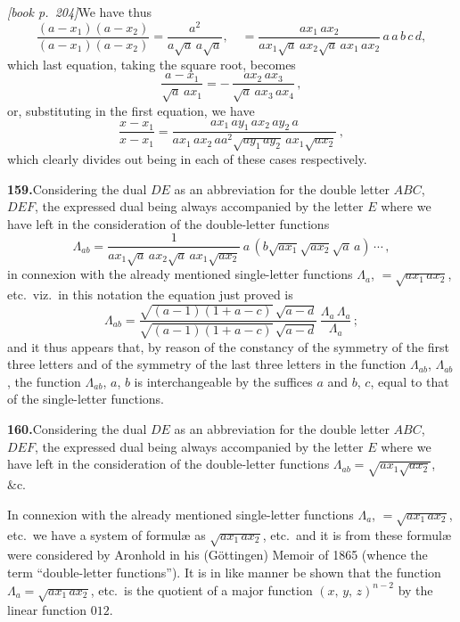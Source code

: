 \documentclass[11pt,a4paper]{article}
\begin{document}
\medskip\noindent\textit{[book p.~204]}\quad We have thus
\[
\frac{(a - x_1)(a - x_2)}{(a - x_1)(a - x_2)} = \frac{a^2}{a\sqrt{a}\,a\sqrt{a}},\quad = \frac{a x_1\,a x_2}{a x_1\sqrt{a}\,a x_2\sqrt{a}\,a x_1\,a x_2}\,a\,a\,b\,c\,d,
\]
which last equation, taking the square root, becomes
\[
\frac{a - x_1}{\sqrt{a}\,a x_1} = -\,\frac{a x_2\,a x_3}{\sqrt{a}\,a x_3\,a x_4}\,,
\]
or, substituting in the first equation, we have
\[
\frac{x - x_1}{x - x_1} = \frac{ax_1\,ay_1\,ax_2\,ay_2\,a}{a x_1\,a x_2\,a a^2\sqrt{ay_1\,ay_2}\,a x_1\sqrt{ax_2}}\,,
\]
which clearly divides out being in each of these cases respectively.

\medskip\noindent\textbf{159.}\quad Considering the dual $DE$ as an abbreviation for the double letter $ABC$, $DEF$, the expressed dual being always accompanied by the letter $E$ where we have left in the consideration of the double-letter functions
\[
\Lambda_{ab} = \frac{1}{a x_1\sqrt{a}\,a x_2\sqrt{a}\,a x_1\sqrt{a x_2}}\,a\,(b\sqrt{ax_1}\sqrt{ax_2}\sqrt{a}\,a)\,\cdots\,,
\]
in connexion with the already mentioned single-letter functions $\Lambda_{a}$, $= \sqrt{a x_1\,a x_2}$, etc.\ viz.\ in this notation the equation just proved is
\[
\Lambda_{ab} = \frac{\sqrt{(a-1)(1+a-c)}\,\sqrt{a-d}}{\sqrt{(a-1)(1+a-c)}\,\sqrt{a-d}}\,\frac{\Lambda_{a}\,\Lambda_{a}}{\Lambda_{a}}\,;
\]
and it thus appears that, by reason of the constancy of the symmetry of the first three letters and of the symmetry of the last three letters in the function $\Lambda_{ab}$, $\Lambda_{ab}$, the function $\Lambda_{ab}$, $a$, $b$ is interchangeable by the suffices $a$ and $b$, $c$, equal to that of the single-letter functions.

\medskip\noindent\textbf{160.}\quad Considering the dual $DE$ as an abbreviation for the double letter $ABC$, $DEF$, the expressed dual being always accompanied by the letter $E$ where we have left in the consideration of the double-letter functions $\Lambda_{ab} = \sqrt{a x_1\sqrt{a x_2}}$, $\&\text{c.}$

In connexion with the already mentioned single-letter functions $\Lambda_{a}$, $= \sqrt{a x_1\,a x_2}$, etc.\ we have a system of formul\ae{} as $\sqrt{a x_1\,a x_2}$, etc.\ and it is from these formul\ae{} were considered by Aronhold in his (G\"ottingen) Memoir of 1865 (whence the term ``double-letter functions''). It is in like manner be shown that the function $\Lambda_a = \sqrt{a x_1\,a x_2}$, etc.\ is the quotient of a major function $(x,\,y,\,z)^{n-2}$ by the linear function $012$.
\end{document}
